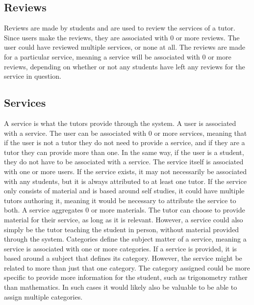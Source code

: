 \subsection{Reviews}
Reviews are made by students and are used to review the services of a tutor.
Since users make the reviews, they are associated with 0 or more reviews.
The user could have reviewed multiple services, or none at all.
The reviews are made for a particular service, meaning a service will be associated with 0 or more reviews, depending on whether or not any students have left any reviews for the service in question.

\subsection{Services}
A service is what the tutors provide through the system.
A user is associated with a service.
The user can be associated with 0 or more services, meaning that if the user is not a tutor they do not need to provide a service, and if they are a tutor they can provide more than one. 
In the same way, if the user is a student, they do not have to be associated with a service.
The service itself is associated with one or more users.
If the service exists, it may not necessarily be associated with any students, but it is always attributed to at least one tutor.
If the service only consists of material and is based around self studies, it could have multiple tutors authoring it, meaning it would be necessary to attribute the service to both.
A service aggregates 0 or more materials.
The tutor can choose to provide material for their service, as long as it is relevant.
However, a service could also simply be the tutor teaching the student in person, without material provided through the system.
Categories define the subject matter of a service, meaning a service is associated with one or more categories.
If a service is provided, it is based around a subject that defines its category.
However, the service might be related to more than just that one category.
The category assigned could be more specific to provide more information for the student, such as trigonometry rather than mathematics.
In such cases it would likely also be valuable to be able to assign multiple categories.
